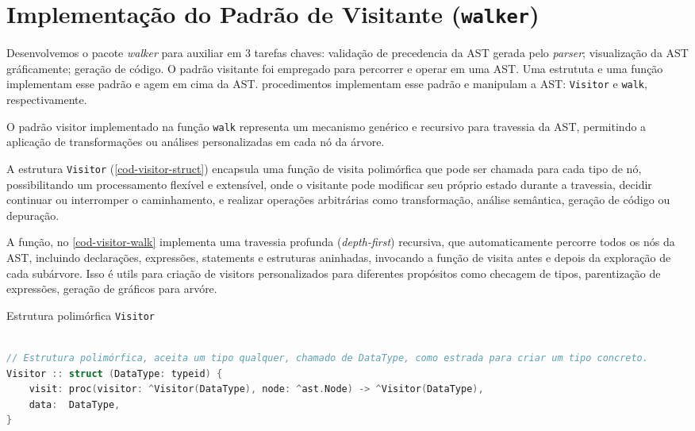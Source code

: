 
\section{Implementação do Padrão de Visitante (\texttt{walker})}

Desenvolvemos o pacote \textit{walker} para auxiliar em 3 tarefas chaves: validação de precedencia da AST gerada pelo \textit{parser}; visualização da AST gráficamente; geração de código. O padrão visitante foi empregado para percorrer e operar em uma AST. Uma estrututa e uma função implementam esse padrão e agem em cima da AST. procedimentos implementam esse padrão e manipulam a AST: \texttt{Visitor} e \texttt{walk}, respectivamente.


O padrão visitor implementado na função \texttt{walk} representa um mecanismo genérico e recursivo para travessia da AST, permitindo a aplicação de transformações ou análises personalizadas em cada nó da árvore.

A estrutura \texttt{Visitor} (\autoref{cod-visitor-struct}) encapsula uma função de visita polimórfica que pode ser chamada para cada tipo de nó, possibilitando um processamento flexível e extensível, onde o visitante pode modificar seu próprio estado durante a travessia, decidir continuar ou interromper o caminhamento, e realizar operações arbitrárias como transformação, análise semântica, geração de código ou depuração.

A função, no \autoref{cod-visitor-walk} implementa uma travessia profunda (\textit{depth-first}) recursiva, que automaticamente percorre todos os nós da AST, incluindo declarações, expressões, statements e estruturas aninhadas, invocando a função de visita antes e depois da exploração de cada subárvore. Isso é utils para criação de visitors personalizados para diferentes propósitos como checagem de tipos, parentização de expressões, geração de gráficos para arvóre.


\begin{codigo}[htb]
    \caption{\small Estrutura polimórfica \texttt{Visitor}}
        \label{cod-visitor-struct}
\begin{lstlisting}[language = C]

// Estrutura polimórfica, aceita um tipo qualquer, chamado de DataType, como estrada para criar um tipo concreto.
Visitor :: struct (DataType: typeid) {
    visit: proc(visitor: ^Visitor(DataType), node: ^ast.Node) -> ^Visitor(DataType),
    data:  DataType,
}
\end{lstlisting}
\end{codigo}

